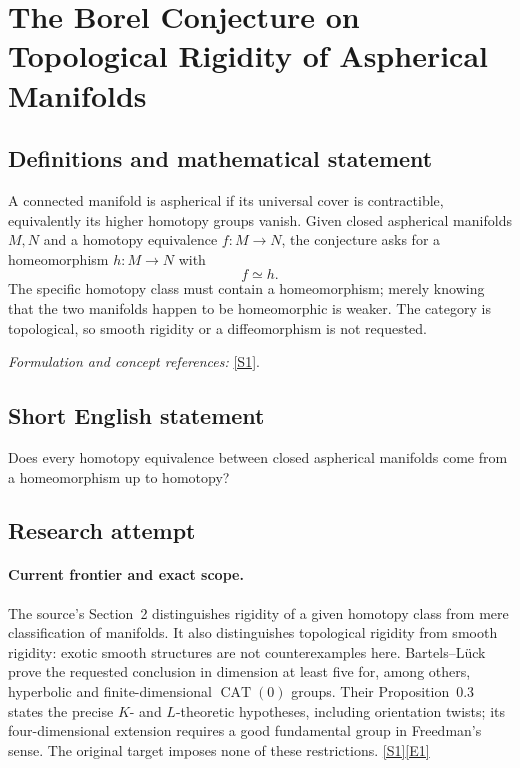 \documentclass[11pt,a4paper]{article}
\newcommand{\sref}[2]{\hyperlink{source:#1:#2}{[S#2]}}
\newcommand{\eref}[2]{\hyperlink{extra:#1:#2}{[E#2]}}
\newif\ifshowcatalogue
\newcommand{\cataloguescope}[1]{\ifshowcatalogue
 \paragraph{Exact scope in the supplied catalogue.}
 \begin{quote}\small #1\end{quote}\fi}
\numberwithin{equation}{section}
\begin{document}
\setcounter{section}{114}
\clearpage
\section{\texorpdfstring{The Borel Conjecture on Topological Rigidity of Aspherical Manifolds}{The Borel Conjecture on Topological Rigidity of Aspherical Manifolds}}\label{115}
\subsection{Definitions and mathematical statement}
A connected manifold is aspherical if its universal cover is contractible, equivalently its higher homotopy groups vanish. Given closed aspherical manifolds $M,N$ and a homotopy equivalence $f:M\to N$, the conjecture asks for a homeomorphism $h:M\to N$ with
\[
 f\simeq h.
\]
The specific homotopy class must contain a homeomorphism; merely knowing that the two manifolds happen to be homeomorphic is weaker. The category is topological, so smooth rigidity or a diffeomorphism is not requested.
\par\smallskip\textit{Formulation and concept references:} \sref{115}{1}.
\cataloguescope{Prove that every homotopy equivalence between closed aspherical manifolds is homotopic to a homeomorphism.}
\subsection{Short English statement}
Does every homotopy equivalence between closed aspherical manifolds come from a homeomorphism up to homotopy?
\subsection{Research attempt}

\paragraph{Current frontier and exact scope.}
The source's Section~2 distinguishes rigidity of a given homotopy class
from mere classification of manifolds. It also distinguishes topological
rigidity from smooth rigidity: exotic smooth structures are not
counterexamples here. Bartels--L\"uck prove the requested conclusion in
dimension at least five for, among others, hyperbolic and finite-dimensional
$\operatorname{CAT}(0)$ groups. Their Proposition~0.3 states the precise
$K$- and $L$-theoretic hypotheses, including orientation twists; its
four-dimensional extension requires a good fundamental group in
Freedman's sense. The original target imposes none of these restrictions.
\sref{115}{1}\eref{115}{1}
\end{document}
